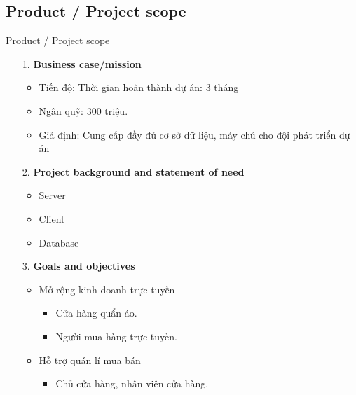 \documentclass[compress]{beamer}
\begin{document}
\subsection{Product / Project scope}
\begin{frame}{Product / Project scope}
\begin{itemize}
\item[1. ] \textbf{Business case/mission}
\begin{itemize}
\item Tiến độ: Thời gian hoàn thành dự án: 3 tháng 
\item Ngân quỹ: 300 triệu.
\item Giả định: Cung cấp đầy đủ cơ sở dữ liệu, máy chủ cho đội phát triển dự án
\end{itemize}
\item[2. ] \textbf{Project background and statement of need}
\begin{itemize}
\item Server
\item Client
\item Database
\end{itemize}
\item[3. ] \textbf{Goals and objectives}
\begin{itemize}
\item Mở rộng kinh doanh trực tuyến
\begin{itemize}
\item Cửa hàng quẩn áo.
\item Người mua hàng trực tuyến.
\end{itemize}
\item Hỗ trợ quán lí mua bán
\begin{itemize}
\item Chủ cửa hàng, nhân viên cửa hàng.
\end{itemize}
\end{itemize}
\end{itemize}
\end{frame}
\end{document}
